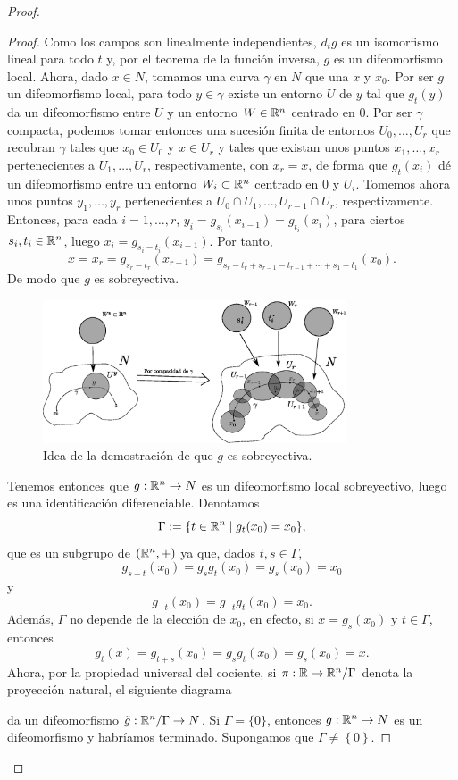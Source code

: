 \begin{proof}
\begin{proof}
Como los campos son linealmente independientes, $d_t g$ es un isomorfismo lineal para todo $t$ y, por el teorema de la función inversa, $g$ es un difeomorfismo local. Ahora, dado $x\in N$, tomamos una curva $\gamma$ en $N$ que una $x$ y $x_0$. Por ser $g$ un difeomorfismo local, para todo $y\in \gamma$ existe un entorno $U$ de $y$ tal que $g_t(y)$ da un difeomorfismo entre $U$ y un entorno $W\in \mathbb{R}^n$ centrado en $0$. Por ser $\gamma$ compacta, podemos tomar entonces una sucesión finita de entornos $U_0,\dots,U_r$ que recubran $\gamma$ tales que $x_0 \in U_0$ y $x \in U_r$ y tales que existan unos puntos $x_1,\dots,x_r$ pertenecientes a $U_1,\dots,U_r$, respectivamente, con $x_r=x$, de forma que $g_t(x_i)$ dé un difeomorfismo entre un entorno $W_i\subset \mathbb{R}^n$ centrado en $0$ y $U_i$. Tomemos ahora unos puntos $y_1,\dots,y_{r}$ pertenecientes a $U_0\cap U_1,\dots,U_{r-1}\cap U_r$, respectivamente. Entonces, para cada $i=1,\dots,r$, $y_i=g_{s_i}(x_{i-1})=g_{t_i}(x_{i})$, para ciertos $s_i, t_i \in \mathbb{R}^n$, luego $x_{i}=g_{s_i-t_i}(x_{i-1})$. Por tanto, 
$$x=x_{r}=g_{s_{r}-t_{r}}(x_{r-1})=g_{s_{r}-t_{r}+s_{r-1}-t_{r-1}+\cdots+s_1-t_1}(x_0).$$ De modo que $g$ es sobreyectiva.

\begin{figure}[h!]
  \centering
  \includegraphics[width=0.8\textwidth]{pics/entornos.eps}
  \caption{\small Idea de la demostración de que $g$ es sobreyectiva.}
  \label{fig:entornos}
\end{figure}

Tenemos entonces que $g:\mathbb{R}^n\rightarrow N$ es un difeomorfismo local sobreyectivo, luego es una identificación diferenciable. Denotamos 
\[  
  \Gamma:=\{t \in \mathbb{R}^n \mid g_t(x_0)=x_0\},
\]
que es un subgrupo de $(\mathbb{R}^n,+)$ ya que, dados $t, s \in \Gamma$, 
\[
  g_{s+t}(x_0)=g_sg_t(x_0)=g_s(x_0)=x_0
\]
y 
\[
  g_{-t}(x_0)=g_{-t}g_t(x_0)=x_0.
\] 
 Además, $\Gamma$ no depende de la elección de $x_0$, en efecto, si $x=g_s (x_0)$ y $t\in \Gamma$, entonces 
\[
  g_t (x) = g_{t+s}(x_0)=g_sg_t(x_0)=g_s(x_0)=x. 
 \] 
Ahora, por la propiedad universal del cociente, si $\pi:\mathbb{R}\rightarrow \mathbb{R}^n/\Gamma$ denota la proyección natural, el siguiente diagrama
\begin{center}
\end{center}
da un difeomorfismo $\tilde{g}: \mathbb{R}^n/\Gamma \rightarrow N$. Si $\Gamma=\{0\}$, entonces $g:\mathbb{R}^n\rightarrow N$ es un difeomorfismo y habríamos terminado. Supongamos que $\Gamma \neq\left\{ 0 \right\}$.


\end{proof}
\end{proof}
